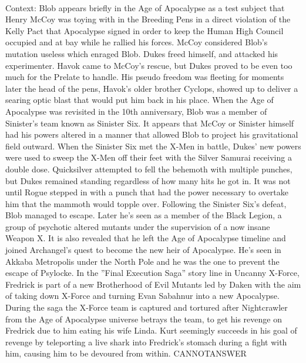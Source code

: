 \documentclass[11pt,a4paper, onecolumn]{article}
\begin{document}
\\ Context: Blob appears briefly in the Age of Apocalypse as a test subject that Henry McCoy was toying with in the Breeding Pens in a direct violation of the Kelly Pact that Apocalypse signed in order to keep the Human High Council occupied and at bay while he rallied his forces. McCoy considered Blob's mutation useless which enraged Blob. Dukes freed himself, and attacked his experimenter. Havok came to McCoy's rescue, but Dukes proved to be even too much for the Prelate to handle. His pseudo freedom was fleeting for moments later the head of the pens, Havok's older brother Cyclops, showed up to deliver a searing optic blast that would put him back in his place. When the Age of Apocalypse was revisited in the 10th anniversary, Blob was a member of Sinister's team known as Sinister Six. It appears that McCoy or Sinister himself had his powers altered in a manner that allowed Blob to project his gravitational field outward. When the Sinister Six met the X-Men in battle, Dukes' new powers were used to sweep the X-Men off their feet with the Silver Samurai receiving a double dose. Quicksilver attempted to fell the behemoth with multiple punches, but Dukes remained standing regardless of how many hits he got in. It was not until Rogue stepped in with a punch that had the power necessary to overtake him that the mammoth would topple over. Following the Sinister Six's defeat, Blob managed to escape. Later he's seen as a member of the Black Legion, a group of psychotic altered mutants under the supervision of a now insane Weapon X. It is also revealed that he left the Age of Apocalypse timeline and joined Archangel's quest to become the new heir of Apocalypse. He's seen in Akkaba Metropolis under the North Pole and he was the one to prevent the escape of Psylocke. In the ''Final Execution Saga'' story line in Uncanny X-Force, Fredrick is part of a new Brotherhood of Evil Mutants led by Daken with the aim of taking down X-Force and turning Evan Sabahnur into a new Apocalypse. During the saga the X-Force team is captured and tortured after Nightcrawler from the Age of Apocalypse universe betrays the team, to get his revenge on Fredrick due to him eating his wife Linda. Kurt seemingly succeeds in his goal of revenge by teleporting a live shark into Fredrick's stomach during a fight with him, causing him to be devoured from within. CANNOTANSWER
\end{document}
